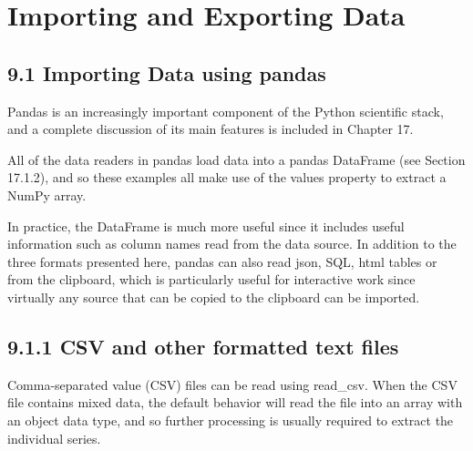 


\section{Importing and Exporting Data}

\subsection{9.1 Importing Data using pandas}

Pandas is an increasingly important component of the Python scientific stack, and a complete discussion
of its main features is included in Chapter 17. 

All of the data readers in pandas load data into a pandas
DataFrame (see Section 17.1.2), and so these examples all make use of the values property to extract a
NumPy array. 

In practice, the DataFrame is much more useful since it includes useful information such
as column names read from the data source. In addition to the three formats presented here, pandas can
also read json, SQL, html tables or from the clipboard, which is particularly useful for interactive work
since virtually any source that can be copied to the clipboard can be imported.

\subsection{9.1.1 CSV and other formatted text files}

Comma-separated value (CSV) files can be read using read_csv. When the CSV file contains mixed data,
the default behavior will read the file into an array with an object data type, and so further processing is
usually required to extract the individual series.

